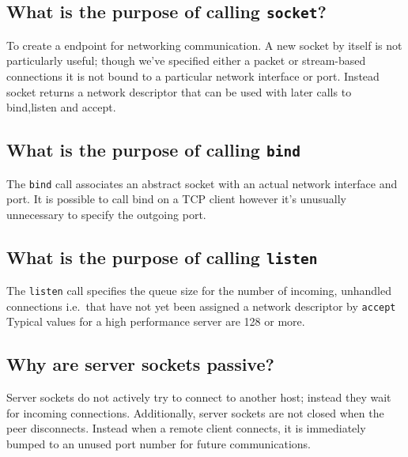 \subsection{\texorpdfstring{What is the purpose of calling
\texttt{socket}?}{What is the purpose of calling socket?}}\label{what-is-the-purpose-of-calling-socket}

To create a endpoint for networking communication. A new socket by
itself is not particularly useful; though we've specified either a
packet or stream-based connections it is not bound to a particular
network interface or port. Instead socket returns a network descriptor
that can be used with later calls to bind,listen and accept.

\subsection{\texorpdfstring{What is the purpose of calling
\texttt{bind}}{What is the purpose of calling bind}}\label{what-is-the-purpose-of-calling-bind}

The \texttt{bind} call associates an abstract socket with an actual
network interface and port. It is possible to call bind on a TCP client
however it's unusually unnecessary to specify the outgoing port.

\subsection{\texorpdfstring{What is the purpose of calling
\texttt{listen}}{What is the purpose of calling listen}}\label{what-is-the-purpose-of-calling-listen}

The \texttt{listen} call specifies the queue size for the number of
incoming, unhandled connections i.e.~that have not yet been assigned a
network descriptor by \texttt{accept}\\Typical values for a high
performance server are 128 or more.

\subsection{Why are server sockets
passive?}\label{why-are-server-sockets-passive}

Server sockets do not actively try to connect to another host; instead
they wait for incoming connections. Additionally, server sockets are not
closed when the peer disconnects. Instead when a remote client connects,
it is immediately bumped to an unused port number for future
communications.

